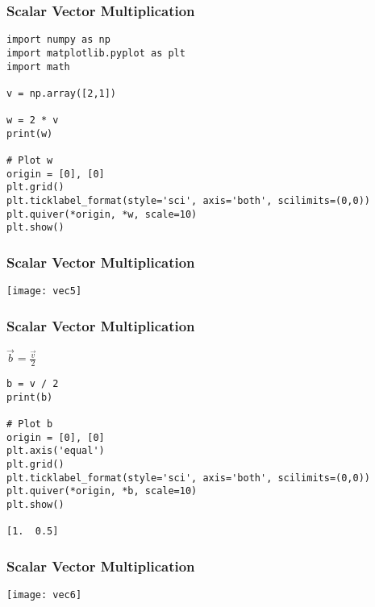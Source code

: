  \begin{frame}[fragile] \frametitle{Scalar Vector Multiplication}

 \begin{lstlisting}
import numpy as np
import matplotlib.pyplot as plt
import math

v = np.array([2,1])

w = 2 * v
print(w)

# Plot w
origin = [0], [0]
plt.grid()
plt.ticklabel_format(style='sci', axis='both', scilimits=(0,0))
plt.quiver(*origin, *w, scale=10)
plt.show()
 \end{lstlisting}
 

 
\end{frame}

 \begin{frame}[fragile] \frametitle{Scalar Vector Multiplication}


\begin{center}
\texttt{[image: vec5]}
\end{center}

 
\end{frame}

 \begin{frame}[fragile] \frametitle{Scalar Vector Multiplication}

 $\vec{b} = \frac{\vec{v}}{2}$
 
 \begin{lstlisting}
b = v / 2
print(b)

# Plot b
origin = [0], [0]
plt.axis('equal')
plt.grid()
plt.ticklabel_format(style='sci', axis='both', scilimits=(0,0))
plt.quiver(*origin, *b, scale=10)
plt.show()
 
[1.  0.5]

 \end{lstlisting}

\end{frame}

 \begin{frame}[fragile] \frametitle{Scalar Vector Multiplication}


\begin{center}
\texttt{[image: vec6]}
\end{center}

 
\end{frame}



